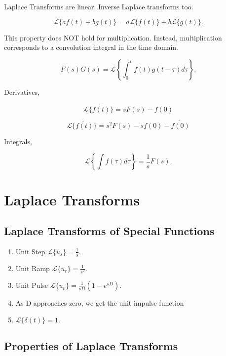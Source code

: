 \documentclass[12pt, a4paper]{report}
\begin{document}
  Laplace Transforms are linear. Inverse Laplace transforms too.

  \[
      \mathcal{L}\{af(t) + bg(t)\} = a \mathcal{L}\{f(t)\} + b \mathcal{L}\{g(t)\}
    .\]

  This property does NOT hold for multiplication. Instead, multiplication corresponds to a convolution integral in the time domain.

  \[
      F(s)G(s) = \mathcal{L}\left\{\int_0^t f(t)g(t - \tau) d\tau\right\}
    .\]

  Derivatives,

  \begin{equation}
    \mathcal{L}\{\dot{f(t)}\} = sF(s) - f(0)
  \end{equation}

  \begin{equation}
    \mathcal{L}\{\ddot{f(t)}\} = s ^2 F(s) - sf(0) - \dot{f(0)}
  \end{equation}

  Integrals,

  \[
      \mathcal{L}\left\{\int f(\tau)d \tau \right\} = \frac{1}{s} F(s)
    .\]


  \chapter{Laplace Transforms}

  \section{Laplace Transforms of Special Functions}

  \begin{enumerate}
    \item Unit Step $ \mathcal{L}\{u_s\} = \frac{1}{s}. $
    \item Unit Ramp $ \mathcal{L}\{u_r\} = \frac{1}{s ^2}. $
    \item Unit Pulse $ \mathcal{L}\{u_p\} = \frac{1}{sD} \left( 1-e^{sD} \right). $
    \item As D approaches zero, we get the unit impulse function
    \item $ \mathcal{L}\{\delta(t)\} = 1. $
  \end{enumerate}

  \section{Properties of Laplace Transforms}
\end{document}

